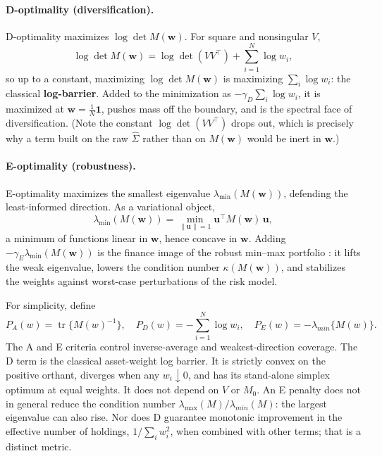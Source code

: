 \documentclass[11pt]{article}
\newcommand{\Sighat}{\hat\Sigma}
\newcommand{\tr}{\operatorname{tr}}
\newcommand{\one}{\mathbf{1}}
\newcommand{\w}{\mathbf{w}}
\newcommand{\uu}{\mathbf{u}}
\newcommand{\M}{M(\w)}
\newcommand{\lammin}{\lambda_{\min}}
\begin{document}
\paragraph{D-optimality (diversification).} D-optimality maximizes $\log\det\M$.
For square and nonsingular $V$,
\[
  \log\det\M=\log\det(VV^\top)+\sum_{i=1}^{N}\log w_i,
\]
so up to a constant, maximizing $\log\det\M$ is maximizing $\sum_i\log w_i$: the
classical \textbf{log-barrier}. Added to the minimization as
$-\gamma_D\sum_i\log w_i$, it is maximized at $\w=\tfrac1N\one$, pushes mass off
the boundary, and is the spectral face of diversification. (Note the constant
$\log\det(VV^\top)$ drops out, which is precisely why a term built on the raw
$\Sighat$ rather than on $\M$ would be inert in $\w$.)

\paragraph{E-optimality (robustness).} E-optimality maximizes the smallest
eigenvalue $\lammin(\M)$, defending the least-informed direction. As a
variational object,
\[
  \lammin(\M)=\min_{\lVert\uu\rVert=1}\uu^\top\M\,\uu,
\]
a minimum of functions linear in $\w$, hence concave in $\w$. Adding
$-\gamma_E\lammin(\M)$ is the finance image of the robust min--max portfolio
\cite{goldfarb2003}: it lifts the weak eigenvalue, lowers the condition number
$\kappa(\M)$, and stabilizes the weights against worst-case perturbations of the
risk model.

For simplicity, define
\begin{equation}\label{eq:criteria}
 P_A(w)=\tr\{M(w)^{-1}\},\quad P_D(w)=-\sum_{i=1}^N\log w_i,\quad P_E(w)=-\lambda_{min}\{M(w)\}.
\end{equation}
The A and E criteria control inverse-average and weakest-direction coverage. The D term is the classical asset-weight log barrier. It is strictly convex on the positive orthant, diverges when any $w_i\downarrow0$, and has its stand-alone simplex optimum at equal weights. It does not depend on $V$ or $M_0$. An E penalty does not in general reduce the condition number $\lambda_{\max}(M)/\lambda_{min}(M)$: the largest eigenvalue can also rise. Nor does D guarantee monotonic improvement in the effective number of holdings, $1/\sum_iw_i^2$, when combined with other terms; that is a distinct metric.
\end{document}
